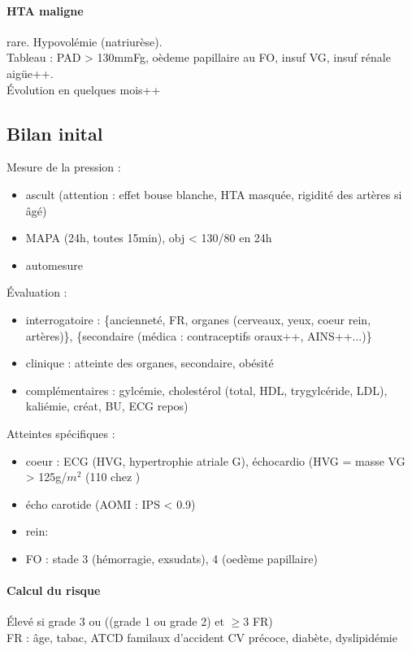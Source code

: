 \documentclass{article}
\begin{document}
\paragraph{HTA maligne} rare. Hypovolémie (natriurèse). \\
Tableau : PAD > 130mmFg, oèdeme papillaire au FO, insuf VG, insuf rénale
aigüe++. \\
Évolution en quelques mois++

\subsection{Bilan inital}
Mesure de la pression : 
\begin{itemize}
  \item ascult (attention : effet bouse blanche, HTA masquée, rigidité des
    artères si âgé)
  \item MAPA (24h, toutes 15min), obj < 130/80 en 24h
  \item automesure 
\end{itemize}
Évaluation :
\begin{itemize}
  \item interrogatoire : \{ancienneté, FR, organes (cerveaux, yeux, coeur rein,
    artères)\}, \{secondaire (médica : contraceptifs oraux++, AINS++...)\}
  \item clinique : atteinte des organes, secondaire, obésité
  \item complémentaires : gylcémie, cholestérol (total, HDL, trygylcéride, LDL),
kaliémie, créat, BU, ECG repos)
\end{itemize}
Atteintes spécifiques :
\begin{itemize}
  \item coeur : ECG (HVG, hypertrophie atriale G), échocardio (HVG = masse VG >
    125g/$m^2$ (110 chez \female)
  \item écho carotide (AOMI : IPS < 0.9)
  \item rein: 
  \item FO : stade 3 (hémorragie, exsudats), 4 (oedème papillaire)
\end{itemize}

\paragraph{Calcul du risque}
Élevé si grade 3 ou ((grade 1 ou grade 2) et $\ge 3$ FR)\\
FR : âge, tabac, ATCD familaux d'accident CV précoce, diabète, dyslipidémie
\end{document}
